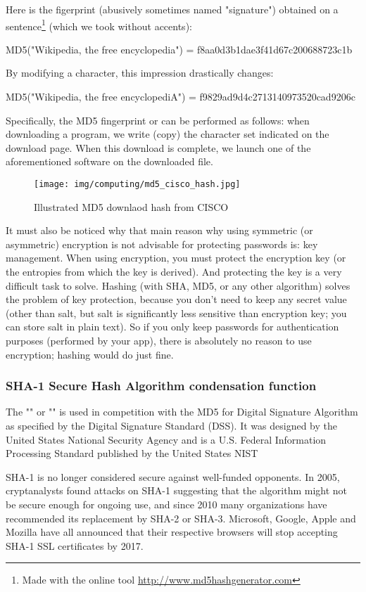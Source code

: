 	Here is the figerprint (abusively sometimes named "signature") obtained on a sentence\footnote{Made with the online tool \url{http://www.md5hashgenerator.com}} (which we took without accents):
	\begin{center}
	MD5("Wikipedia, the free encyclopedia") = f8aa0d3b1dae3f41d67c200688723c1b
	\end{center}
	By modifying a character, this impression drastically changes:
	\begin{center}
	MD5("Wikipedia, the free encyclopediA") = f9829ad9d4c2713140973520cad9206c
	\end{center}
	Specifically, the MD5 fingerprint or can be performed as follows: when downloading a program, we write (copy) the character set indicated on the download page. When this download is complete, we launch one of the aforementioned software on the downloaded file.
	\begin{figure}[H]
		\centering
		\texttt{[image: img/computing/md5\_cisco\_hash.jpg]}
		\caption{Illustrated MD5 downlaod hash from CISCO}
	\end{figure}
	It must also be noticed why that main reason why using symmetric (or asymmetric) encryption is not advisable for protecting passwords is: key management. When using encryption, you must protect the encryption key (or the entropies from which the key is derived). And protecting the key is a very difficult task to solve. Hashing (with SHA, MD5, or any other algorithm) solves the problem of key protection, because you don't need to keep any secret value (other than salt, but salt is significantly less sensitive than encryption key; you can store salt in plain text). So if you only keep passwords for authentication purposes (performed by your app), there is absolutely no reason to use encryption; hashing would do just fine. 
	
	\pagebreak
	\subsubsection{SHA-1 Secure Hash Algorithm condensation function}\label{sha 1}
	The "" or "" is used in competition with the MD5 for Digital Signature Algorithm as specified by the Digital Signature Standard (DSS). It was designed by the United States National Security Agency and is a U.S. Federal Information Processing Standard published by the United States NIST

	SHA-1 is no longer considered secure against well-funded opponents. In 2005, cryptanalysts found attacks on SHA-1 suggesting that the algorithm might not be secure enough for ongoing use, and since 2010 many organizations have recommended its replacement by SHA-2 or SHA-3. Microsoft, Google, Apple and Mozilla have all announced that their respective browsers will stop accepting SHA-1 SSL certificates by 2017.

